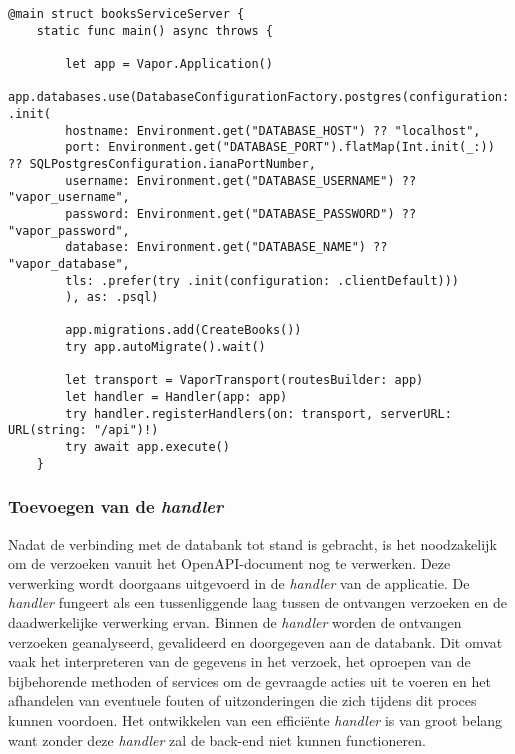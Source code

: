 \begin{lstlisting}[caption=booksServiceServer file]
@main struct booksServiceServer {
    static func main() async throws {
        
        let app = Vapor.Application()
        app.databases.use(DatabaseConfigurationFactory.postgres(configuration: .init(
        hostname: Environment.get("DATABASE_HOST") ?? "localhost",
        port: Environment.get("DATABASE_PORT").flatMap(Int.init(_:)) ?? SQLPostgresConfiguration.ianaPortNumber,
        username: Environment.get("DATABASE_USERNAME") ?? "vapor_username",
        password: Environment.get("DATABASE_PASSWORD") ?? "vapor_password",
        database: Environment.get("DATABASE_NAME") ?? "vapor_database",
        tls: .prefer(try .init(configuration: .clientDefault)))
        ), as: .psql)
        
        app.migrations.add(CreateBooks())
        try app.autoMigrate().wait()
        
        let transport = VaporTransport(routesBuilder: app)
        let handler = Handler(app: app)
        try handler.registerHandlers(on: transport, serverURL: URL(string: "/api")!)
        try await app.execute()
    }

\end{lstlisting}

\subsubsection{Toevoegen van de \textit{handler}}
Nadat de verbinding met de databank tot stand is gebracht, is het noodzakelijk om de verzoeken vanuit het OpenAPI-document nog te verwerken. Deze verwerking wordt doorgaans uitgevoerd in de \textit{handler} van de applicatie. De \textit{handler} fungeert als een tussenliggende laag tussen de ontvangen verzoeken en de daadwerkelijke verwerking ervan.
Binnen de \textit{handler} worden de ontvangen verzoeken geanalyseerd, gevalideerd en doorgegeven aan de databank. Dit omvat vaak het interpreteren van de gegevens in het verzoek, het oproepen van de bijbehorende methoden of services om de gevraagde acties uit te voeren en het afhandelen van eventuele fouten of uitzonderingen die zich tijdens dit proces kunnen voordoen. Het ontwikkelen van een efficiënte \textit{handler} is van groot belang want zonder deze \textit{handler} zal de back-end niet kunnen functioneren.  \\

